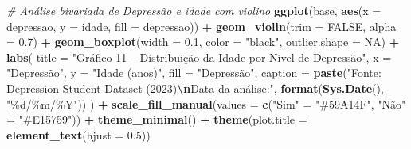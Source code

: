 \documentclass[
]{article}
\newenvironment{Shaded}{\begin{snugshade}}{\end{snugshade}}
\newcommand{\AttributeTok}[1]{\textcolor[rgb]{0.13,0.29,0.53}{#1}}
\newcommand{\CommentTok}[1]{\textcolor[rgb]{0.56,0.35,0.01}{\textit{#1}}}
\newcommand{\ConstantTok}[1]{\textcolor[rgb]{0.56,0.35,0.01}{#1}}
\newcommand{\FloatTok}[1]{\textcolor[rgb]{0.00,0.00,0.81}{#1}}
\newcommand{\FunctionTok}[1]{\textcolor[rgb]{0.13,0.29,0.53}{\textbf{#1}}}
\newcommand{\NormalTok}[1]{#1}
\newcommand{\OtherTok}[1]{\textcolor[rgb]{0.56,0.35,0.01}{#1}}
\newcommand{\SpecialCharTok}[1]{\textcolor[rgb]{0.81,0.36,0.00}{\textbf{#1}}}
\newcommand{\StringTok}[1]{\textcolor[rgb]{0.31,0.60,0.02}{#1}}
\begin{document}
\begin{Shaded}
\begin{Highlighting}[]
\CommentTok{\# Análise bivariada de Depressão e idade com violino}
\FunctionTok{ggplot}\NormalTok{(base, }\FunctionTok{aes}\NormalTok{(}\AttributeTok{x =}\NormalTok{ depressao, }\AttributeTok{y =}\NormalTok{ idade, }\AttributeTok{fill =}\NormalTok{ depressao)) }\SpecialCharTok{+}
  \FunctionTok{geom\_violin}\NormalTok{(}\AttributeTok{trim =} \ConstantTok{FALSE}\NormalTok{, }\AttributeTok{alpha =} \FloatTok{0.7}\NormalTok{) }\SpecialCharTok{+}
  \FunctionTok{geom\_boxplot}\NormalTok{(}\AttributeTok{width =} \FloatTok{0.1}\NormalTok{, }\AttributeTok{color =} \StringTok{"black"}\NormalTok{, }\AttributeTok{outlier.shape =} \ConstantTok{NA}\NormalTok{) }\SpecialCharTok{+}
  \FunctionTok{labs}\NormalTok{(}
    \AttributeTok{title =} \StringTok{"Gráfico 11 – Distribuição da Idade por Nível de Depressão"}\NormalTok{,}
    \AttributeTok{x =} \StringTok{"Depressão"}\NormalTok{,}
    \AttributeTok{y =} \StringTok{"Idade (anos)"}\NormalTok{,}
    \AttributeTok{fill =} \StringTok{"Depressão"}\NormalTok{,}
    \AttributeTok{caption =} \FunctionTok{paste}\NormalTok{(}\StringTok{"Fonte: Depression Student Dataset (2023)}\SpecialCharTok{\textbackslash{}n}\StringTok{Data da análise:"}\NormalTok{, }\FunctionTok{format}\NormalTok{(}\FunctionTok{Sys.Date}\NormalTok{(), }\StringTok{"\%d/\%m/\%Y"}\NormalTok{))}
\NormalTok{  ) }\SpecialCharTok{+}
  \FunctionTok{scale\_fill\_manual}\NormalTok{(}\AttributeTok{values =} \FunctionTok{c}\NormalTok{(}\StringTok{"Sim"} \OtherTok{=} \StringTok{"\#59A14F"}\NormalTok{, }\StringTok{"Não"} \OtherTok{=} \StringTok{"\#E15759"}\NormalTok{)) }\SpecialCharTok{+}
  \FunctionTok{theme\_minimal}\NormalTok{() }\SpecialCharTok{+}
  \FunctionTok{theme}\NormalTok{(}\AttributeTok{plot.title =} \FunctionTok{element\_text}\NormalTok{(}\AttributeTok{hjust =} \FloatTok{0.5}\NormalTok{))}
\end{Highlighting}
\end{Shaded}
\end{document}
